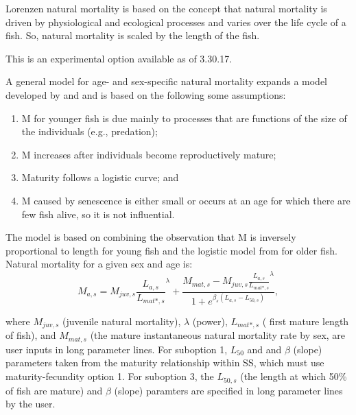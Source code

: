 Lorenzen natural mortality is based on the concept that natural mortality is driven by physiological and ecological processes and varies over the life cycle of a fish. So, natural mortality is scaled by the length of the fish.


This is an experimental option available as of 3.30.17. 

A general model for age- and sex-specific natural mortality expands a model developed by \citet{maunder2010bigeye} and \citet{maunder2011M} and is based on the following some assumptions:

\begin{enumerate}
  \item M for younger fish is due mainly to processes that are functions of the size of the individuals (e.g., predation);
  \item M increases after individuals become reproductively mature;
  \item Maturity follows a logistic curve; and
  \item M caused by senescence is either small or occurs at an age for which there are few fish alive, so it is not influential. 
\end{enumerate}
The model is based on combining the observation that M is inversely proportional to length for young fish \citep{lorenzen2000allometry} and the logistic model from \citet{lehodey2008spatial} for older fish. Natural mortality for a given sex and age is:
\begin{equation}
M_{a,s} = M_{juv,s}\frac{L_{a,s}}{L_{mat*,s}}^{\lambda} + 
\frac{M_{mat,s}-M_{juv,s}\frac{L_{a,s}}{L_{mat*,s}}^{\lambda}}{1+e^{\beta_s(L_{a,s}- L_{50,s})}},
\end{equation}

where $M_{juv,s}$ (juvenile natural mortality), $\lambda$ (power), $L_{mat*,s}$ ( first mature length of fish), and $M_{mat,s}$ (the mature instantaneous natural mortality rate by sex, are user inputs in long parameter lines. For suboption 1, $L_{50}$ and and $\beta$ (slope) parameters taken from the maturity relationship within SS, which must use maturity-fecundity option 1. For suboption 3, the $L_{50,s}$  (the length at which 50\% of fish are mature) and $\beta$ (slope) paramters are specified in long parameter lines by the user.


